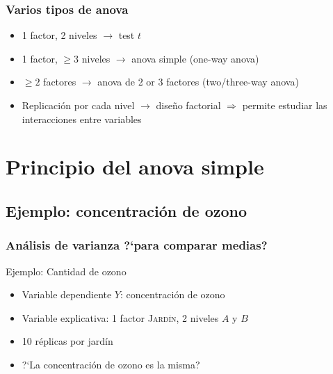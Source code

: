 \documentclass[gray,handout,mathserif]{beamer}
\begin{document}
\begin{frame}[label=anov8]
   \frametitle{Varios tipos de anova}
    \begin{itemize}[<+-| handout:1>]
      \item 1 factor, 2 niveles $\rightarrow$ test $t$
      \item 1 factor, $\geq 3$ niveles $\rightarrow$ anova simple (one-way anova)
      \item $\geq 2$ factores $\rightarrow$ anova de 2 or 3 factores (two/three-way anova)
      \item Replicaci\'on por cada nivel $\rightarrow$ dise\~no factorial $\Rightarrow$ permite estudiar las interacciones entre variables
   \end{itemize}
\end{frame}%



\section[Anova simple]{Principio del anova simple}

\subsection[Ejemplo: ozono]{Ejemplo: concentraci\'on de ozono}

\begin{frame}[label=anov9]
   \frametitle{An\'alisis de varianza ?`para comparar medias?}
   \begin{exampleblock}{Ejemplo: Cantidad de ozono}
      \begin{itemize}
         \item Variable dependiente $Y$: concentraci\'on de ozono
         \item Variable explicativa: 1 factor \textsc{Jard\'in}, 2 niveles $A$ y $B$
         \item 10 r\'eplicas por jard\'in
         \medskip
         \item ?`La concentraci\'on de  ozono es la misma?
      \end{itemize}
   \end{exampleblock}
\end{frame}%
\end{document}
